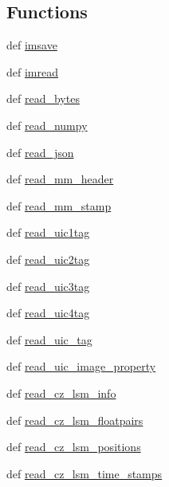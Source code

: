\subsection*{Functions}
\begin{DoxyCompactItemize}
\item 
def \hyperlink{namespacetifffile_aba209b148018b938b5ccd7110fa378b3}{imsave}
\item 
def \hyperlink{namespacetifffile_acdfa4ca96f79ffccc635fb93bd43f1b1}{imread}
\item 
def \hyperlink{namespacetifffile_ab4018f0a52145c56248f1208535adaed}{read\-\_\-bytes}
\item 
def \hyperlink{namespacetifffile_a20df066ea8329f6b44a312bea64f5551}{read\-\_\-numpy}
\item 
def \hyperlink{namespacetifffile_a4104367f847259ab871883caebdc8539}{read\-\_\-json}
\item 
def \hyperlink{namespacetifffile_a73a397a2a2f4bf99333813a3b429ef3d}{read\-\_\-mm\-\_\-header}
\item 
def \hyperlink{namespacetifffile_a4e133874b3469f1d22971a9497620947}{read\-\_\-mm\-\_\-stamp}
\item 
def \hyperlink{namespacetifffile_a8e21c2d21671839917fa41c3162a07eb}{read\-\_\-uic1tag}
\item 
def \hyperlink{namespacetifffile_a7d3d42c242433e466c55fc62298a1d95}{read\-\_\-uic2tag}
\item 
def \hyperlink{namespacetifffile_ab28d370c4b4ca3a4cc169da4384c0801}{read\-\_\-uic3tag}
\item 
def \hyperlink{namespacetifffile_a1573446f02ba5849c1b6ca39945e7c63}{read\-\_\-uic4tag}
\item 
def \hyperlink{namespacetifffile_aa930d750e5fc1d0cab263ff09f4cb636}{read\-\_\-uic\-\_\-tag}
\item 
def \hyperlink{namespacetifffile_a58f8a9059f2137dab53c9383b84c284f}{read\-\_\-uic\-\_\-image\-\_\-property}
\item 
def \hyperlink{namespacetifffile_aa98b1f163a2110f389b97771aeebf13a}{read\-\_\-cz\-\_\-lsm\-\_\-info}
\item 
def \hyperlink{namespacetifffile_acad98afecd0f005b9fa57c0c3c19b1c6}{read\-\_\-cz\-\_\-lsm\-\_\-floatpairs}
\item 
def \hyperlink{namespacetifffile_a925ba1ed09c746a61b71244d697a0887}{read\-\_\-cz\-\_\-lsm\-\_\-positions}
\item 
def \hyperlink{namespacetifffile_a04bc44f423e93d401e943b1fed7d8e3d}{read\-\_\-cz\-\_\-lsm\-\_\-time\-\_\-stamps}

\end{DoxyCompactItemize}
